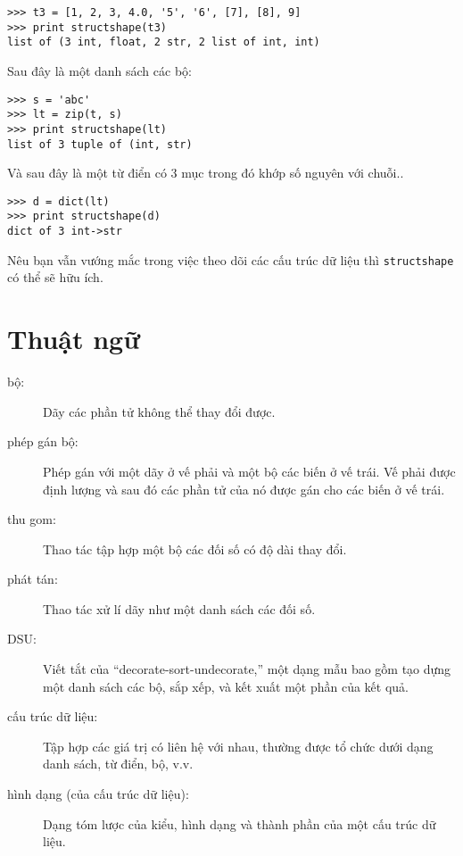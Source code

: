 \documentclass[11pt]{book}
\begin{document}
\beforeverb
\begin{verbatim}
>>> t3 = [1, 2, 3, 4.0, '5', '6', [7], [8], 9]
>>> print structshape(t3)
list of (3 int, float, 2 str, 2 list of int, int)
\end{verbatim}
\afterverb
%
Sau đây là một danh sách các bộ:

\beforeverb
\begin{verbatim}
>>> s = 'abc'
>>> lt = zip(t, s)
>>> print structshape(lt)
list of 3 tuple of (int, str)
\end{verbatim}
\afterverb
%
Và sau đây là một từ điển có 3 mục trong đó khớp số nguyên với chuỗi..

\beforeverb
\begin{verbatim}
>>> d = dict(lt) 
>>> print structshape(d)
dict of 3 int->str
\end{verbatim}
\afterverb
%
Nêu bạn vẫn vướng mắc trong việc theo dõi các cấu trúc dữ liệu thì
{\tt structshape} có thể sẽ hữu ích.


\section{Thuật ngữ}

\begin{description}

\item[bộ:] Dãy các phần tử không thể thay đổi được.

\item[phép gán bộ:] Phép gán với một dãy ở vế phải và một bộ
các biến ở vế trái. Vế phải được định lượng và sau đó các
phần tử của nó được gán cho các biến ở vế trái.

\item[thu gom:] Thao tác tập hợp một bộ các đối số có độ dài
thay đổi.

\item[phát tán:] Thao tác xử lí dãy như một danh sách các đối số.

\item[DSU:] Viết tắt của ``decorate-sort-undecorate,'' một dạng
mẫu bao gồm tạo dựng một danh sách các bộ, sắp xếp, và kết xuất
một phần của kết quả.

\item[cấu trúc dữ liệu:] Tập hợp các giá trị có liên hệ với nhau,
thường được tổ chức dưới dạng danh sách, từ điển, bộ, v.v.

\item[hình dạng (của cấu trúc dữ liệu):] Dạng tóm lược của kiểu,
hình dạng và thành phần của một cấu trúc dữ liệu.

\end{description}
\end{document}
